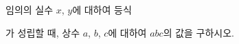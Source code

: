 임의의 실수 $x$, $y$에 대하여 등식 \par\smallskip{}\par\smallskip\noindent 가 성립할 때, 상수 $a$, $b$, $c$에 대하여 $abc$의 값을 구하시오.
